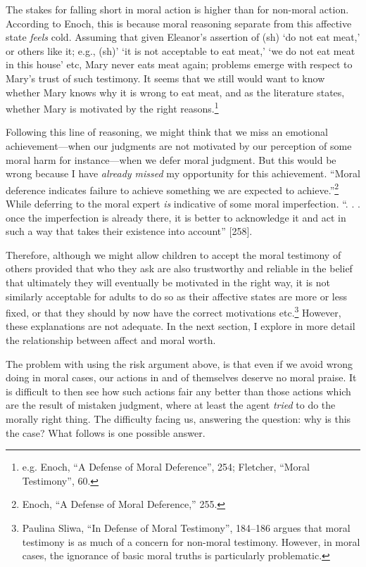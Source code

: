 \documentclass[phdthesis,12pt,final]{wuthesis}
\theoremstyle{definition}
\theoremstyle{definition}
\theoremstyle{definition}
\theoremstyle{definition}
\theoremstyle{remark}
\begin{document}
The stakes for falling short in moral action is higher than for non-moral action. According to Enoch, this is because moral reasoning separate from this affective state \emph{feels} cold. Assuming that given Eleanor's assertion of (sh) `do not eat meat,' or others like it; e.g., (sh)' `it is not acceptable to eat meat,' `we do not eat meat in this house' etc, Mary never eats meat again; problems emerge with respect to Mary's trust of such testimony. It seems that we still would want to know whether Mary knows why it is wrong to eat meat, and as the literature states, whether Mary is motivated by the right reasons.\footnote{e.g. Enoch, {``A {Defense} of {Moral Deference}''}, 254; Fletcher, {``Moral {Testimony}''}, 60.}

Following this line of reasoning, we might think that we miss an emotional achievement---when our judgments are not motivated by our perception of some moral harm for instance---when we defer moral judgment. But this would be wrong because I have \emph{already missed} my opportunity for this achievement. ``Moral deference indicates failure to achieve something we are expected to achieve.''\footnote{Enoch, {``A {Defense} of {Moral Deference},''} 255.} While deferring to the moral expert \emph{is} indicative of some moral imperfection. ``. . . once the imperfection is already there, it is better to acknowledge it and act in such a way that takes their existence into account'' {[}258{]}.

Therefore, although we might allow children to accept the moral testimony of others provided that who they ask are also trustworthy and reliable in the belief that ultimately they will eventually be motivated in the right way, it is not similarly acceptable for adults to do so as their affective states are more or less fixed, or that they should by now have the correct motivations etc.\footnote{Paulina Sliwa, {``In Defense of Moral Testimony''}, 184--186 argues that moral testimony is as much of a concern for non-moral testimony. However, in moral cases, the ignorance of basic moral truths is particularly problematic.} However, these explanations are not adequate. In the next section, I explore in more detail the relationship between affect and moral worth.

The problem with using the risk argument above, is that even if we avoid wrong doing in moral cases, our actions in and of themselves deserve no moral praise. It is difficult to then see how such actions fair any better than those actions which are the result of mistaken judgment, where at least the agent \emph{tried} to do the morally right thing. The difficulty facing us, answering the question: why is this the case? What follows is one possible answer.
\end{document}
